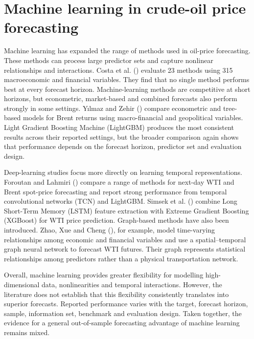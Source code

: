 \documentclass[
  british,
  12pt,
  oneside]{book}
\begin{document}
\section{Machine learning in crude-oil price forecasting}\label{lit-ml}

Machine learning has expanded the range of methods used in oil-price forecasting. These methods can process large predictor sets and capture nonlinear relationships and interactions. Costa et al. () evaluate 23 methods using 315 macroeconomic and financial variables. They find that no single method performs best at every forecast horizon. Machine-learning methods are competitive at short horizons, but econometric, market-based and combined forecasts also perform strongly in some settings. Yılmaz and Zehir () compare econometric and tree-based models for Brent returns using macro-financial and geopolitical variables. Light Gradient Boosting Machine (LightGBM) produces the most consistent results across their reported settings, but the broader comparison again shows that performance depends on the forecast horizon, predictor set and evaluation design.

Deep-learning studies focus more directly on learning temporal representations. Foroutan and Lahmiri () compare a range of methods for next-day WTI and Brent spot-price forecasting and report strong performance from temporal convolutional networks (TCN) and LightGBM. Simsek et al. () combine Long Short-Term Memory (LSTM) feature extraction with Extreme Gradient Boosting (XGBoost) for WTI price prediction. Graph-based methods have also been introduced. Zhao, Xue and Cheng (), for example, model time-varying relationships among economic and financial variables and use a spatial--temporal graph neural network to forecast WTI futures. Their graph represents statistical relationships among predictors rather than a physical transportation network.

Overall, machine learning provides greater flexibility for modelling high-dimensional data, nonlinearities and temporal interactions. However, the literature does not establish that this flexibility consistently translates into superior forecasts. Reported performance varies with the target, forecast horizon, sample, information set, benchmark and evaluation design. Taken together, the evidence for a general out-of-sample forecasting advantage of machine learning remains mixed.
\end{document}
